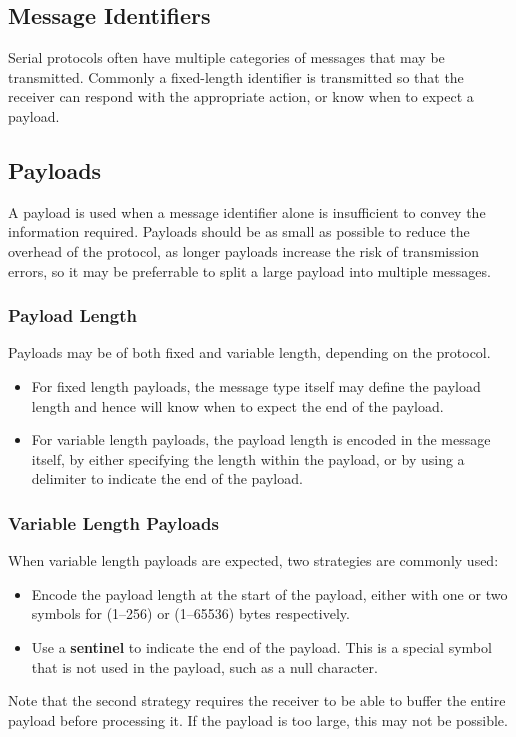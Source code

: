\documentclass[a4paper]{report}
\begin{document}
\subsection{Message Identifiers}
Serial protocols often have multiple categories of messages that may be transmitted.
Commonly a fixed-length identifier is transmitted so that the receiver can
respond with the appropriate action, or know when to expect a payload.
\subsection{Payloads}
A payload is used when a message identifier alone is insufficient to convey the information required.
Payloads should be as small as possible to reduce the overhead of the protocol, as longer payloads
increase the risk of transmission errors, so it may be preferrable to split a large payload into multiple
messages.
\subsubsection{Payload Length}
Payloads may be of both fixed and variable length, depending on the protocol.
\begin{itemize}
    \item For fixed length payloads, the message type itself may define the payload length and hence will know when
    to expect the end of the payload.
    \item For variable length payloads, the payload length is encoded in the message itself, by either
    specifying the length within the payload, or by using a delimiter to indicate the end of the payload.
\end{itemize}
\subsubsection{Variable Length Payloads}
When variable length payloads are expected, two strategies are commonly used:
\begin{itemize}
    \item Encode the payload length at the start of the payload, either with one or two symbols for (1--256) or (1--65536) bytes respectively.
    \item Use a \textbf{sentinel} to indicate the end of the payload. This is a special symbol that is not used in the payload, such as a null character.
\end{itemize}
Note that the second strategy requires the receiver to be able to buffer the entire payload before processing it.
If the payload is too large, this may not be possible.
\end{document}

